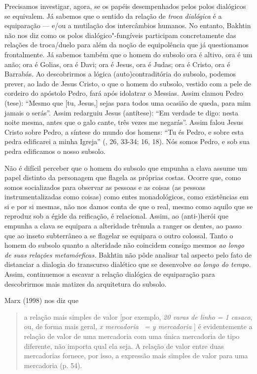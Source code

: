 Precisamos investigar, agora, se os papéis desempenhados pelos polos
dialógicos se equivalem. Já sabemos que o sentido da relação de
\emph{troca dialógica} é a equiparação --- e/ou a mutilação dos
intercâmbios humanos. No entanto, Bakhtin não nos diz como os polos
dialógico"-fungíveis participam concretamente das relações de troca/duelo
para além da noção de equipolência que já questionamos frontalmente. Já
sabemos também que o homem do subsolo ora é altivo, ora é um anão; ora é
Golias, ora é Davi; ora é Jesus, ora é Judas; ora é Cristo, ora é
Barrabás. Ao descobrirmos a lógica (auto)contraditória do subsolo,
podemos prever, ao lado de Jesus Cristo, o que o homem do subsolo,
vestido com a pele de cordeiro do apóstolo Pedro, fará após idolatrar o
Messias. Assim clamou Pedro (tese): ``Mesmo que {[}tu, Jesus,{]} sejas
para todos uma ocasião de queda, para mim jamais o serás''. Assim
redarguiu Jesus (antítese): ``Em verdade te digo: nesta noite mesma,
antes que o galo cante, três vezes me negarás''. Assim falou Jesus
Cristo sobre Pedro, a síntese do mundo dos homens: ``Tu és Pedro, e
sobre esta pedra edificarei a minha Igreja'' (, 26, 33-34; 16,
18). Nós somos Pedro, e sob sua pedra edificamos o nosso subsolo.

Não é difícil perceber que o homem do subsolo que empunha a clava assume
um papel distinto da personagem que flagela as próprias costas. Ocorre
que, como somos socializados para observar as pessoas e as coisas (as
pessoas instrumentalizadas como coisas) como entes monadológicos, como
existências em si e por si mesmas, não nos damos conta de que o real,
mesmo como aquilo que se reproduz sob a égide da reificação, é
relacional. Assim, ao \mbox{(anti-)herói} que empunha a clava se equipara a
alteridade trêmula a ranger os dentes, ao passo que ao inseto
subterrâneo a se flagelar se equipara o outro colossal. Tanto o homem do
subsolo quanto a alteridade não coincidem consigo mesmos \emph{ao longo
de suas relações metamórficas.} Bakhtin não pôde analisar tal aspecto
pelo fato de distanciar a dialogia do transcurso dialético que se
desenvolve \emph{ao longo do tempo.} Assim, continuemos a escavar a
relação dialógica de equiparação para descobrirmos mais matizes da
arquitetura do subsolo.

Marx (1998) nos diz que

\begin{quote}
a relação mais simples de valor {[}por exemplo, \emph{20 varas de linho
= 1 casaco}, ou, de forma mais geral, \emph{x mercadoria ~= y
mercadoria }{]} é evidentemente a relação de valor de uma mercadoria
com uma única mercadoria de tipo diferente, não importa qual ela seja. A
relação de valor entre duas mercadorias fornece, por isso, a expressão
mais simples de valor para uma mercadoria (p. 54).
\end{quote}


